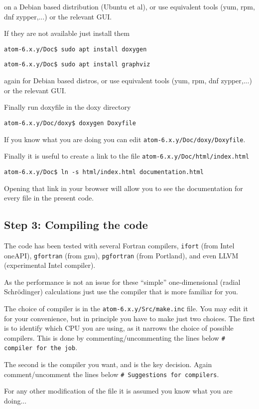 \documentclass[11pt]{article}
\begin{document}
on a Debian based distribution (Ubuntu et al), or use equivalent tools (yum, rpm, dnf zypper,...) or the relevant GUI.

If they are not available just install them

\noindent\texttt{atom-6.x.y/Doc\$ sudo apt install doxygen}

\noindent\texttt{atom-6.x.y/Doc\$ sudo apt install graphviz}

again for Debian based distros, or use equivalent tools (yum, rpm, dnf zypper,...) or the relevant GUI.

Finally run doxyfile in the doxy directory

\noindent\texttt{atom-6.x.y/Doc/doxy\$ doxygen Doxyfile}

If you know what you are doing you can edit \texttt{atom-6.x.y/Doc/doxy/Doxyfile}.

Finally it is useful to create a link to the file \texttt{atom-6.x.y/Doc/html/index.html}

\noindent\texttt{atom-6.x.y/Doc\$ ln -s html/index.html documentation.html}

Opening that link in your browser will allow you to see the documentation for every file in the present code.

\subsection{Step 3: Compiling the code}
\label{sec:step3}

The code has been tested with several Fortran compilers, \texttt{ifort} (from Intel oneAPI),
\texttt{gfortran} (from gnu),
\texttt{pgfortran} (from Portland), and even LLVM (experimental Intel compiler).

As the performance is not an issue for these ``simple'' one-dimensional (radial Schrödinger) calculations
just use the compiler that is more familiar for you.

The choice of compiler is in the \texttt{atom-6.x.y/Src/make.inc} file.  You may edit it for your convenience,
but in principle you have to make just two choices.  The first is to identify which CPU you are using,
as it narrows the choice of possible compilers.  This is done by commenting/uncommenting
the lines below \texttt{\#   compiler for the job}.

The second is the compiler you want, and is the key decision.  Again comment/uncomment the lines below
\texttt{\#   Suggestions for compilers}.

For any other modification of the file it is assumed you know what you are doing...
\end{document}
